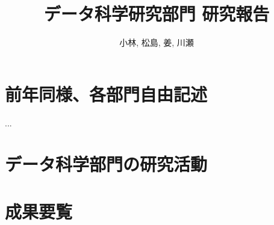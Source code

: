 \documentclass[11pt]{jarticle}
\title{データ科学研究部門 研究報告}
\author{小林, 松島, 姜, 川瀬}
\begin{document}
\maketitle

\section{前年同様、各部門自由記述}
...

\section{データ科学部門の研究活動}







\section{成果要覧}


\end{document}
